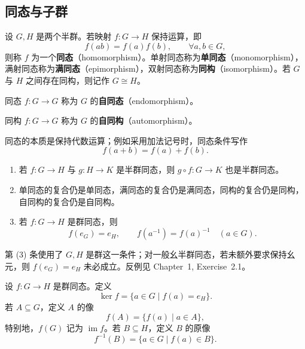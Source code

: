 \subsection{同态与子群}

\begin{definition}[同态]\label{def:homomorphism}
设 $G,H$ 是两个半群。若映射 $f:G\to H$ 保持运算，即
\[
  f(ab)=f(a)f(b),\qquad \forall a,b\in G,
\]
则称 $f$ 为一个\textbf{同态}（homomorphism）。单射同态称为\textbf{单同态}（monomorphism），满射同态称为\textbf{满同态}（epimorphism），双射同态称为\textbf{同构}（isomorphism）。若 $G$ 与 $H$ 之间存在同构，则记作 $G\cong H$。

同态 $f:G\to G$ 称为 $G$ 的\textbf{自同态}（endomorphism）。

同构 $f:G\to G$ 称为 $G$ 的\textbf{自同构}（automorphism）。
\end{definition}

\begin{purplenote}
同态的本质是保持代数运算；例如采用加法记号时，同态条件写作
\[
  f(a+b)=f(a)+f(b).
\]
\end{purplenote}

\begin{proposition}\label{prop:hom-basic}
\begin{enumerate}[label=(\arabic*)]
  \item 若 $f:G\to H$ 与 $g:H\to K$ 是半群同态，则 $g\circ f:G\to K$ 也是半群同态。
  \item 单同态的复合仍是单同态，满同态的复合仍是满同态，同构的复合仍是同构，自同构的复合仍是自同构。
  \item 若 $f:G\to H$ 是群同态，则
  \[
    f(e_G)=e_H,\qquad f(a^{-1})=f(a)^{-1}\quad(a\in G).
  \]
\end{enumerate}
\end{proposition}

\begin{purplenote}
第 (3) 条使用了 $G,H$ 是群这一条件；对一般幺半群同态，若未额外要求保持幺元，则 $f(e_G)=e_H$ 未必成立。反例见 Chapter~1, Exercise~2.1。
\end{purplenote}

\begin{definition}[核、像与原像]\label{def:kernel-image-preimage}
设 $f:G\to H$ 是群同态。定义
\[
  \ker f=\{a\in G\mid f(a)=e_H\}.
\]
若 $A\subseteq G$，定义 $A$ 的像
\[
  f(A)=\{f(a)\mid a\in A\},
\]
特别地，$f(G)$ 记为 $\operatorname{im}f$。若 $B\subseteq H$，定义 $B$ 的原像
\[
  f^{-1}(B)=\{a\in G\mid f(a)\in B\}.
\]
\end{definition}

